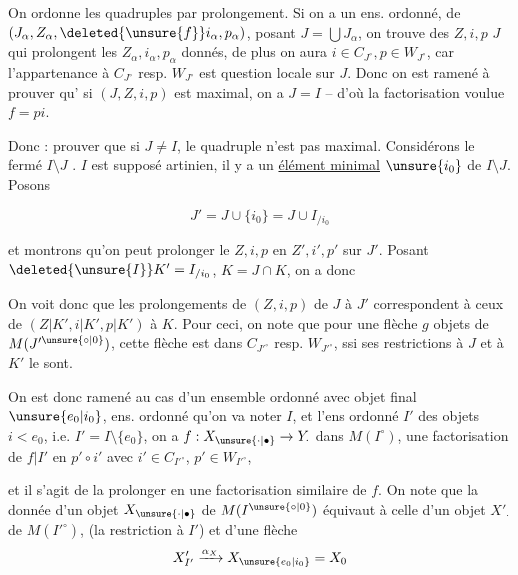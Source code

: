 On ordonne les quadruples par prolongement. Si on a un ens.  ordonné, de $(J_\alpha,Z_\alpha,\deleted{\unsure{f}}i_\alpha,p_\alpha)$, posant $J=\bigcup J_\alpha$, on trouve des $Z,i,p$    $J$ qui prolongent les $Z_\alpha,i_\alpha,p_\alpha$ donnés, de plus on aura $i\in C_{J^\circ},p\in W_{J^\circ}$, car l'appartenance à  $C_{J^\circ}$ resp. $W_{J^\circ}$ est question locale sur $J$. Donc  on est ramené à prouver qu' si $(J,Z,i,p)$ est maximal, on a $J=I$ -- d'où la factorisation voulue $f=pi$.

Donc : prouver que si $J\ne I$, le quadruple n'est pas maximal. Considérons le fermé  $I\setminus J$ . $I$ est supposé artinien, il y a un \uline{élément minimal} $\unsure{i_0}$ de $I\setminus J$. Posons

\[
 J'=J\cup\{i_0\}=J\cup I_{/i_0}
\]

et montrons qu'on peut prolonger le   $Z,i,p$ en $Z',i',p'$ sur $J'$. Posant $\deleted{\unsure{I}}K'=I_{/i_0}$, $K=J\cap K$, on a donc


On voit donc que les prolongements de $(Z,i,p)$ de $J$ à $J'$ correspondent à ceux de $(Z|K',i|K',p|K')$ à $K$. Pour ceci, on note que pour une flèche $g$  objets de $M(J'^{\unsure{\circ|0}})$, cette flèche est dans $C_{J'^\circ}$ resp. $W_{J'^\circ}$, ssi ses restrictions à $J$ et à $K'$ le sont.

On est donc ramené au cas  d'un ensemble ordonné  avec objet final $\unsure{e_0|i_0}$, ens. ordonné qu'on va noter $I$, et l'ens ordonné $I'$ des objets $i<e_0$, i.e. $I'=I\setminus\{e_0\}$, on a $f:X_{\unsure{\cdot|\bullet}}\to Y_{\cdot}$  dans $M(I^\circ)$, une factorisation de $f|I'$ en $p'\circ i'$ avec $i'\in C_{I'^\circ}$, $p'\in W_{I'^\circ}$,

et il s'agit de la prolonger en une factorisation similaire de $f$. On note que la donnée d'un objet $X_{\unsure{\cdot|\bullet}}$ de $M(I^{\unsure{\circ|0}})$ équivaut à celle d'un objet $X'_{\cdot}$ de $M(I'^\circ)$, (la restriction  à $I'$) et d'une flèche
\[
 X'_{I'}\xrightarrow{\alpha_X}X_{\unsure{e_0|i_0}}=X_0
\]

